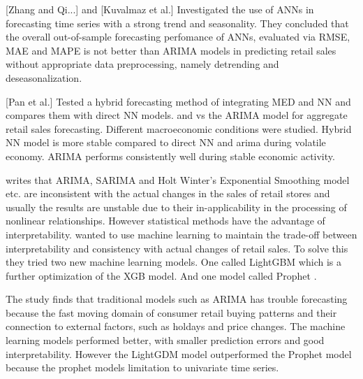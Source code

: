 [Zhang and Qi...] and [Kuvalmaz et al.]
Investigated the use of ANNs in forecasting time series with a strong trend and seasonality.
They concluded that the overall out-of-sample forecasting perfomance of ANNs, 
evaluated via RMSE, MAE and MAPE is not better than ARIMA models in predicting
retail sales without appropriate data preprocessing,
namely detrending and deseasonalization.

[Pan et al.]
Tested a hybrid forecasting method of integrating MED and NN and compares them with direct NN models.
and vs the ARIMA model for aggregate retail sales forecasting.
Different macroeconomic conditions were studied.
Hybrid NN model is more stable compared to direct NN and arima during volatile economy.
ARIMA performs consistently well during stable economic activity.


\cite{Weng2020} writes that ARIMA, SARIMA and Holt Winter's
Exponential Smoothing model etc. are inconsistent with the actual changes in the sales
of retail stores and usually the results are unstable due to their in-applicability
in the processing of nonlinear relationships.
However statistical methods have the advantage of interpretability.
\cite{Bowen2020} wanted to use machine learning to maintain
the trade-off between interpretability and consistency with actual
changes of retail sales.
To solve this they tried two new machine learning models.
One called LightGBM which is a further optimization of the XGB model.
And one model called Prophet \citep{Zunic2020}.

The study finds that traditional models such as ARIMA has trouble forecasting
because the fast moving domain of consumer retail buying patterns and 
their connection to external factors, such as holdays and price changes.
The machine learning models performed better, with smaller prediction errors
and good interpretability.
However the LightGDM model outperformed the Prophet model because the prophet
models limitation to univariate time series.


%
%


